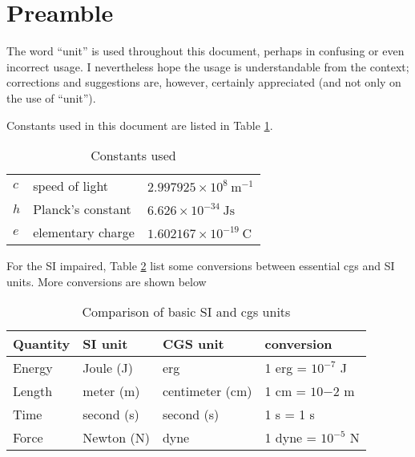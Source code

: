 \documentclass[12pt,a4paper]{article}
\newcommand{\jmsqshz}{\ensuremath{\mathrm{J}\ \mathrm{m}^{-2}\ \mathrm{s^{-1}} \mathrm{Hz^{-1}}}}
\begin{document}
\section*{Preamble}

The word ``unit'' is used throughout this document, perhaps in confusing or even incorrect usage. I nevertheless hope the usage is understandable from the context; corrections and suggestions are, however, certainly appreciated (and not only on the use of ``unit'').

Constants used in this document are listed in Table \ref{table:constants}.
\begin{table}[h!]
\begin{tabular}{l|l|l}
$c$ & speed of light & $2.997925 \times 10^8\ \mathrm{m }^{-1}$ \\
$h$ & Planck's constant & $6.626 \times 10^{-34}\ \mathrm{J s}$ \\
$e$ & elementary charge & $1.602167 \times 10^{-19}\ \mathrm{C}$ \\
\end{tabular}
\caption{\label{table:constants}Constants used}
\end{table}



For the SI impaired, Table \ref{table:comparison} list some conversions between essential cgs and SI units. More conversions are shown below
\begin{table}[h!]
\begin{tabular}{l|l|l|l}
Quantity & SI unit & CGS unit & conversion \\
\hline
Energy & Joule (J) & erg & 1 erg = $10^{-7}$ J \\
Length & meter (m) & centimeter (cm) & 1 cm = $10{-2}$ m \\
Time & second (s) & second (s) & 1 s = 1 s \\
Force & Newton (N) & dyne & 1 dyne = $10^{-5}$ N \\
\end{tabular}
\caption{\label{table:comparison}Comparison of basic SI and cgs units}
\end{table}
\end{document}
